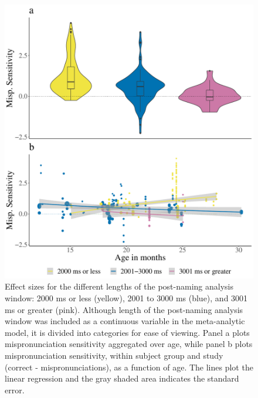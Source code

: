 \documentclass[
  english,
  man, noextraspace]{apa6}
\begin{document}
\begin{figure}
\centering
\includegraphics{VonHolzenBergmann_MPMetaAnalysis_files/figure-latex/PlotPostNameCondAge-1.pdf}
\caption{\label{fig:PlotPostNameCondAge}Effect sizes for the different lengths of the post-naming analysis window: 2000 ms or less (yellow), 2001 to 3000 ms (blue), and 3001 ms or greater (pink). Although length of the post-naming analysis window was included as a continuous variable in the meta-analytic model, it is divided into categories for ease of viewing. Panel a plots mispronunciation sensitivity aggregated over age, while panel b plots mispronunciation sensitivity, within subject group and study (correct - mispronunciations), as a function of age. The lines plot the linear regression and the gray shaded area indicates the standard error.}
\end{figure}
\end{document}
